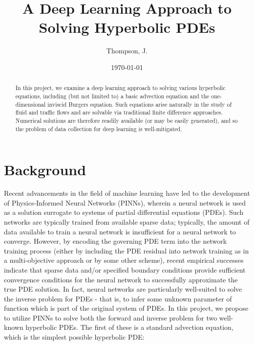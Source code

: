 \documentclass[letterpaper,12pt]{article}
\begin{document}
    \title{
        A Deep Learning Approach to Solving Hyperbolic PDEs\\
    }
    \author{%
        Thompson, J.
    }
    \date{\today}
    \maketitle

    \begin{abstract}
        In this project, we examine a deep learning approach to solving various hyperbolic equations, including 
        (but not limited to) a basic advection equation and the one-dimensional inviscid Burgers equation.
        Such equations arise naturally in the study of fluid and traffic flows and are solvable via traditional 
        finite difference approaches. Numerical solutions are therefore readily available (or may be easily generated),
        and so the problem of data collection for deep learning is well-mitigated.
    \end{abstract}


    \section{Background}\label{sec:background}
    Recent advancements in the field of machine learning have led to the development of Physics-Informed Neural 
    Networks (PINNs), wherein a neural network is used as a solution surrogate to systems of partial differential 
    equations (PDEs). Such networks are typically trained from available sparse data; typically, the amount of data
    available to train a neural network is insufficient for a neural network to converge. However, by encoding the 
    governing PDE term into the network training process (either by including the PDE residual into network training as
    in a multi-objective approach or by some other scheme), recent empirical successes indicate that
    sparse data and/or specified boundary conditions provide sufficient convergence conditions for the neural network to
    successfully approximate the true PDE solution.\cite{raissi_physics-informed_2019} In fact, neural networks are 
    particularly well-suited to solve the inverse problem for PDEs - that is, to infer some unknown parameter of 
    function which is part of the original system of PDEs.\cite{lu_deepxde_2021} In this project, we propose to utilize
    PINNs to solve both the forward and inverse problem for two well-known hyperbolic PDEs. The first of these is a 
    standard advection equation, which is the simplest possible hyperbolic PDE:
\end{document}
